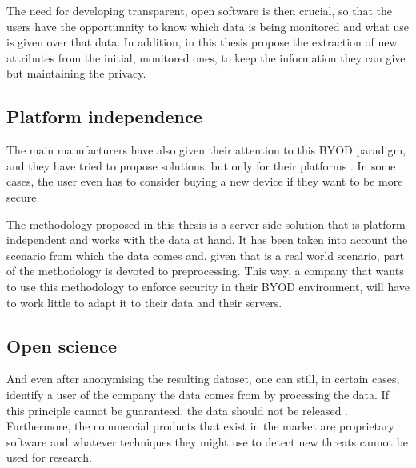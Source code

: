 The need for developing transparent, open software is then crucial, so that the users have the opportunnity to know which data is being monitored and what use is given over that data. In addition, in this thesis propose the extraction of new attributes from the initial, monitored ones, to keep the information they can give but maintaining the privacy.

\subsection{Platform independence}
\label{subsec:platf_ind}

The main manufacturers have also given their attention to this BYOD paradigm, and they have tried to propose solutions, but only for their platforms \cite{de2015corporate}. In some cases, the user even has to consider buying a new device if they want to be more secure.

The methodology proposed in this thesis is a server-side solution that is platform independent and works with the data at hand. It has been taken into account the scenario from which the data comes and, given that is a real world scenario, part of the methodology is devoted to preprocessing. This way, a company that wants to use this methodology to enforce security in their BYOD environment, will have to work little to adapt it to their data and their servers.

\subsection{Open science}
\label{subsec:openS}

And even after anonymising the resulting dataset, one can still, in certain cases, identify a user of the company the data comes from by processing the data. If this principle cannot be guaranteed, the data should not be released \cite{boillat2014handbook}. Furthermore, the commercial products that exist in the market \cite{de2015corporate} are proprietary software and whatever techniques they might use to detect new threats cannot be used for research.


